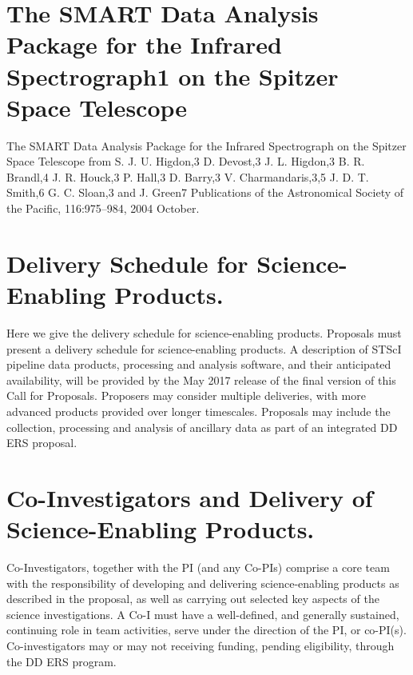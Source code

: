 \section{The SMART Data Analysis Package for the Infrared Spectrograph1 on the Spitzer Space Telescope}
The SMART Data Analysis Package for the Infrared Spectrograph on the
Spitzer Space Telescope from S. J. U. Higdon,3 D. Devost,3
J. L. Higdon,3 B. R. Brandl,4 J. R. Houck,3 P. Hall,3 D. Barry,3
V. Charmandaris,3,5 J. D. T. Smith,6 G. C. Sloan,3 and J. Green7
Publications of the Astronomical Society of the Pacific, 116:975–984,
2004 October.



\section{Delivery Schedule for Science-Enabling Products.} 
Here we give the delivery schedule for science-enabling products. 
Proposals must present a delivery schedule for science-enabling products. A description of STScI pipeline data products, processing and analysis software, and their anticipated availability, will be provided by the May 2017 release of the final version of this Call for Proposals.  Proposers may consider multiple deliveries, with more advanced products provided over longer timescales. Proposals may include the collection, processing and analysis of ancillary data as part of an integrated DD ERS proposal.

\section{Co-Investigators and Delivery of Science-Enabling Products.}
Co-Investigators, together with the PI (and any Co-PIs) comprise a core team with the responsibility of developing and delivering science-enabling products as described in the proposal, as well as carrying out selected key aspects of the science investigations.  A Co-I must have a well-defined, and generally sustained, continuing role in team activities, serve under the direction of the PI, or co-PI(s). Co-investigators may or may not receiving funding, pending eligibility, through the DD ERS program. 

